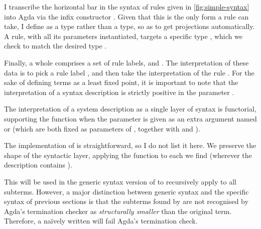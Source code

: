 
I transcribe the horizontal bar in the syntax of rules given in
\cref{fig:simple-syntax} into Agda via the infix constructor
.
Given that this is the only form a rule can take, I define  as
a  type rather than a  type, so as to get
projections automatically.
A rule, with all its parameters instantiated, targets a specific type
, which we check to match the desired type .


Finally, a whole  comprises a set  of rule
labels, and \AgdaSpace{}\AgdaSymbol{:}\AgdaSpace{}%
\AgdaSpace{}\AgdaSymbol{$\to$}\AgdaSpace{}.
The interpretation of these data is to pick a rule label , and then
take the interpretation of the rule \AgdaSpace{}.
For the sake of defining terms as a least fixed point, it is important to note
that the interpretation of a syntax description is strictly positive in the
parameter \AgdaBound{,\_$\llbracket$\_$\vdash$\_$\rrbracket$}.


The interpretation of a system description as a single layer of syntax is
functorial, supporting the  function when the parameter
\AgdaBound{,\_$\llbracket$\_$\vdash$\_$\rrbracket$} is given as an extra
argument named  or  (which are both fixed as
parameters of , together with \AgdaBound{$\Gamma$} and
\AgdaBound{$\Delta$}).


The implementation of  is straightforward, so I do not list
it here.
We preserve
the shape of the syntactic layer, applying the function to each 
we find (wherever the description contains \AgdaInductiveConstructor{$\langle$}%
\AgdaSpace{}\AgdaBound{$\Delta$}\AgdaSpace{}%
\AgdaSpace{}\AgdaSpace{}%
\AgdaInductiveConstructor{$\rangle$}).

This  will be used in the generic syntax version of
 to recursively apply  to all subterms.
However, a major distinction between generic syntax and the specific syntax of
previous sections is that the subterms found by  are not
recognised by Agda's termination checker as \emph{structurally smaller} than
the original term.
Therefore, a na\"{i}vely written  will fail Agda's termination
check.

